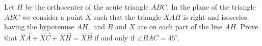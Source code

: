 Let $H$ be the orthocenter of the acute triangle $ABC.$ In the plane of the triangle $ABC$ we consider a point $X$ such that the triangle $XAH$ is right and isosceles, having the hypotenuse $AH,$ and $B$ and $X$ are on each part of the line $AH.$ Prove that $\overrightarrow{XA}+\overrightarrow{XC}+\overrightarrow{XH}=\overrightarrow{XB}$ if and only if $ \angle BAC=45^{\circ}.$
